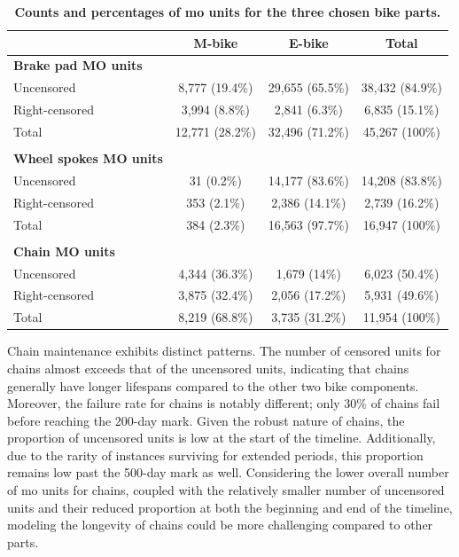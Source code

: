     \begin{table}[htbp!]
        \centering
        \footnotesize
        \caption[Counts and percentages of MO units for the three chosen bike parts]{
            \textbf{Counts and percentages of \ac{mo} units for the three chosen bike parts.}
        }
        \label{tab:MO_units_censoring_vs_model}
        \begin{tabular}{lccc}
            \toprule
                            & {M-bike}        & {E-bike}         & {Total}         \\
            \midrule
            \textbf{Brake pad MO units}                                           \\
            Uncensored     & 8,777 (19.4\%)  & 29,655 (65.5\%)  & 38,432 (84.9\%) \\
            Right-censored & 3,994 (8.8\%)   & 2,841 (6.3\%)    & 6,835 (15.1\%)  \\
            Total          & 12,771 (28.2\%) & 32,496 (71.2\%)  & 45,267 (100\%)  \\ \\
        
            \textbf{Wheel spokes MO units}                                        \\
            Uncensored     & 31 (0.2\%)      & 14,177 (83.6\%)  & 14,208 (83.8\%) \\
            Right-censored & 353 (2.1\%)     & 2,386 (14.1\%)   & 2,739  (16.2\%) \\
            Total          & 384  (2.3\%)    & 16,563  (97.7\%) & 16,947 (100\%)  \\ \\
        
            \textbf{Chain MO units}                                               \\
            Uncensored     & 4,344 (36.3\%)  & 1,679 (14\%)     & 6,023 (50.4\%)  \\
            Right-censored & 3,875 (32.4\%)  & 2,056 (17.2\%)   & 5,931 (49.6\%)  \\
            Total          & 8,219 (68.8\%)  & 3,735 (31.2\%)   & 11,954 (100\%)  \\
            \bottomrule
        \end{tabular}
        \end{table}

    Chain maintenance exhibits distinct patterns. The number of censored units for chains almost exceeds that of the uncensored units, indicating that chains generally have longer lifespans compared to the other two bike components. Moreover, the failure rate for chains is notably different; only 30\% of chains fail before reaching the 200-day mark. Given the robust nature of chains, the proportion of uncensored units is low at the start of the timeline. Additionally, due to the rarity of instances surviving for extended periods, this proportion remains low past the 500-day mark as well. Considering the lower overall number of \ac{mo} units for chains, coupled with the relatively smaller number of uncensored units and their reduced proportion at both the beginning and end of the timeline, modeling the longevity of chains could be more challenging compared to other parts.

